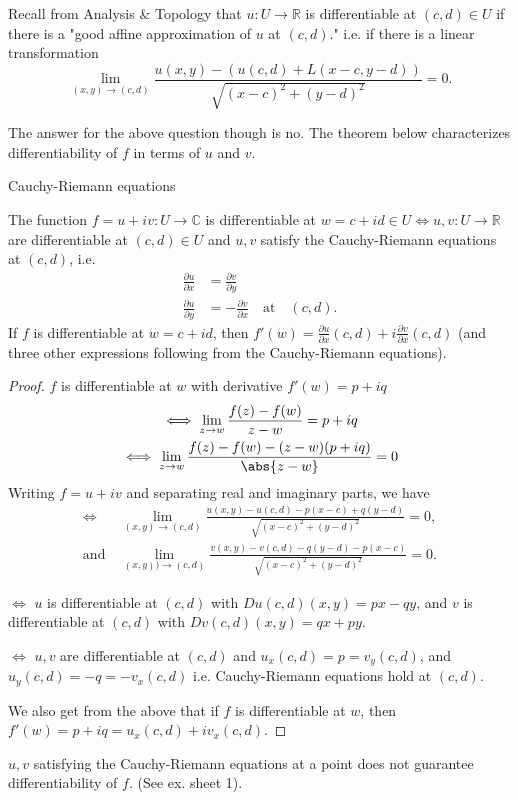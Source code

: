 Recall from Analysis \& Topology that \(u: U \to \mathbb{R}\) is differentiable at \((c,d)\in U\) if there is a "good affine approximation of \(u\) at \((c,d)\)." i.e. if there is a linear transformation
\[
    \lim\limits_{(x,y) \to (c,d)} \frac{u(x,y) - (u(c,d) + L(x-c,y-d))}{\sqrt{(x-c)^2 + (y-d)^2}} = 0.
\]

The answer for the above question though is no. The theorem below characterizes differentiability of \(f\) in terms of \(u\) and \(v\).

\begin{theorem}{Cauchy-Riemann equations}{}

    The function \(f = u + iv:U\to \mathbb{C}\) is differentiable at \(w = c + id \in U \iff  u,v: U \to \mathbb{R}\) are differentiable at \((c,d) \in U\) and \(u, v\) satisfy the Cauchy-Riemann equations at \((c,d)\), i.e.
    \begin{align*}
        \frac{\partial u}{\partial x} &= \frac{\partial v}{\partial y}\\
        \frac{\partial u}{\partial y} &= - \frac{\partial v}{\partial x}\quad\text{at}\quad(c,d).
    \end{align*}
    If \(f\) is differentiable at \(w = c + id\), then \(f'(w) = \frac{\partial u}{\partial x} (c,d) + i \frac{\partial v}{\partial x} (c,d)\) (and three other expressions following from the Cauchy-Riemann equations).
\end{theorem}

\begin{proof}
    \(f\) is differentiable at \(w\) with derivative \(f'(w) = p + iq\)
    \begin{gather*}
        \iff \lim_{z \to w} \frac{f(z) - f(w)}{z - w} = p + iq\\
        \iff \lim_{z \to w} \frac{f(z) - f(w) - (z - w)(p + iq)}{\abs{z-w}} = 0\\
    \end{gather*}
    Writing \(f = u + iv\) and separating real and imaginary parts, we have
    \begin{align*}
        \iff &\lim\limits_{(x, y) \to (c, d)} \frac{u(x,y) - u(c,d) - p(x - c) + q(y - d)}{\sqrt{(x - c)^2 + (y - d)^2} } = 0,\\
        \text{and}~&\lim\limits_{(x, y)) \to (c,d)} \frac{v(x,y) - v(c,d) - q(y - d) - p(x - c)}{\sqrt{(x - c)^2 + (y - d)^2} } = 0.
    \end{align*}

    \(\iff \) \(u\) is differentiable at \((c,d)\) with \(Du(c,d)(x,y) = px - qy\), and \(v\) is differentiable at \((c,d)\) with \(Dv(c,d)(x,y) = qx + py\).

    \(\iff \) \(u,v\) are differentiable at \((c,d)\) and \(u_x (c,d) = p = v_y(c,d)\), and \(u_y(c,d) = -q = -v_x(c,d)\) i.e. Cauchy-Riemann equations hold at \((c,d)\).

    We also get from the above that if \(f\) is differentiable at \(w\), then \(f'(w) = p + iq = u_x(c,d) + iv_x(c,d)\).
\end{proof}
\begin{remark}
    \(u, v\) satisfying the Cauchy-Riemann equations at a point does not guarantee differentiability of \(f\). (See ex. sheet 1).
\end{remark}

